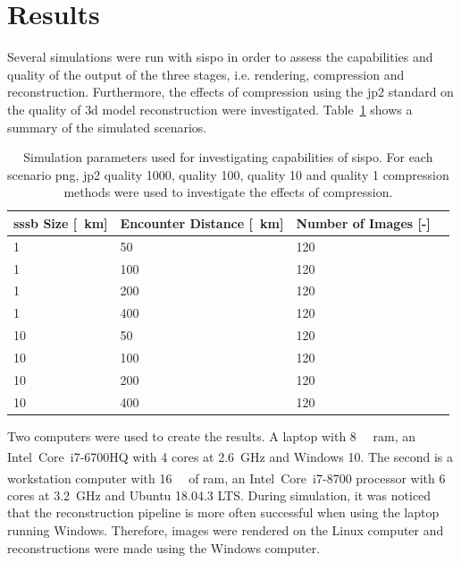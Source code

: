 \section{Results} \label{sec:results}
Several simulations were run with \gls{sispo} in order to assess the capabilities and quality of the output of the three stages, i.e. rendering, compression and reconstruction. Furthermore, the effects of compression using the \gls{jp2} standard on the quality of \gls{3d} model reconstruction were investigated. Table~\ref{tab:sim_params} shows a summary of the simulated scenarios.

\begin{table}[htb]
    \centering
    \caption{Simulation parameters used for investigating capabilities of \gls{sispo}. For each scenario \gls{png}, \gls{jp2} quality 1000, quality 100, quality 10 and quality 1 compression methods were used to investigate the effects of compression.}
    \label{tab:sim_params}
    \begin{tabular}{l|lll}
        \textbf{\gls{sssb} Size [\SI{}{\kilo\meter}]}& \textbf{Encounter Distance [\SI{}{\kilo\meter}]} & \textbf{Number of Images [-]} \\ \hline
        1  & 50  & 120\\
        1  & 100 & 120\\
        1  & 200 & 120\\
        1  & 400 & 120\\
        10 & 50  & 120\\
        10 & 100 & 120\\
        10 & 200 & 120\\
        10 & 400 & 120\\
    \end{tabular}
\end{table}

Two computers were used to create the results. A laptop with \SI{8}{\giga\byte} \gls{ram}, an Intel\textsuperscript{\textregistered}~Core\texttrademark~i7-6700HQ with \SI{4}{} cores at \SI{2.6}{\giga\hertz} and Windows 10. The second is a workstation computer with \SI{16}{\giga\byte} of \gls{ram}, an Intel\textsuperscript{\textregistered}~Core\texttrademark~i7-8700 processor with \SI{6}{} cores at \SI{3.2}{\giga\hertz} and Ubuntu 18.04.3 LTS. During simulation, it was noticed that the reconstruction pipeline is more often successful when using the laptop running Windows. Therefore, images were rendered on the Linux computer and reconstructions were made using the Windows computer.

